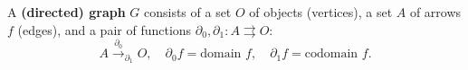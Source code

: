 A \textbf{(directed) graph} $G$ consists of a set $O$ of objects (vertices), a set $A$ of arrows $f$ (edges), and a pair of functions $\partial_0, \partial_1: A \rightrightarrows O$:
\[
A \xrightarrow{\partial_0}_{\partial_1} O, \quad \partial_0 f = \text{domain } f, \quad \partial_1 f = \text{codomain } f.
\]